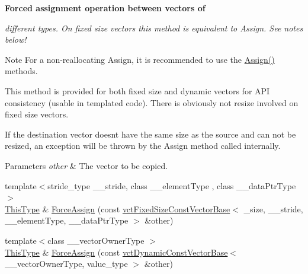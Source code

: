 \begin{Indent}{\bf Forced assignment operation between vectors of}\par
{\em different types. On fixed size vectors this method is equivalent to Assign. See notes below!

\begin{DoxyNote}{Note}
For a non-\/reallocating Assign, it is recommended to use the \hyperlink{classvct_fixed_size_vector_base_a0bfbc67194bcb1aa6b614524df8d1fa1}{Assign()} methods.

This method is provided for both fixed size and dynamic vectors for A\+P\+I consistency (usable in templated code). There is obviously not resize involved on fixed size vectors.

If the destination vector doesn\textquotesingle{}t have the same size as the source and can not be resized, an exception will be thrown by the Assign method called internally.
\end{DoxyNote}

\begin{DoxyParams}{Parameters}
{\em other} & The vector to be copied. \\
\hline
\end{DoxyParams}
}\begin{DoxyCompactItemize}
\item 
{\footnotesize template$<$stride\+\_\+type \+\_\+\+\_\+stride, class \+\_\+\+\_\+element\+Type , class \+\_\+\+\_\+data\+Ptr\+Type $>$ }\\\hyperlink{classvct_fixed_size_const_vector_base_a071063bc4fa43112cc287b2dbef53180}{This\+Type} \& \hyperlink{classvct_fixed_size_vector_base_a27268af4d9808d33446164107bc18d0a}{Force\+Assign} (const \hyperlink{classvct_fixed_size_const_vector_base}{vct\+Fixed\+Size\+Const\+Vector\+Base}$<$ \+\_\+size, \+\_\+\+\_\+stride, \+\_\+\+\_\+element\+Type, \+\_\+\+\_\+data\+Ptr\+Type $>$ \&other)
\item 
{\footnotesize template$<$class \+\_\+\+\_\+vector\+Owner\+Type $>$ }\\\hyperlink{classvct_fixed_size_const_vector_base_a071063bc4fa43112cc287b2dbef53180}{This\+Type} \& \hyperlink{classvct_fixed_size_vector_base_a2d4938c4dfd8f40e12cba75d58fbe816}{Force\+Assign} (const \hyperlink{classvct_dynamic_const_vector_base}{vct\+Dynamic\+Const\+Vector\+Base}$<$ \+\_\+\+\_\+vector\+Owner\+Type, value\+\_\+type $>$ \&other)
\end{DoxyCompactItemize}
\end{Indent}
{\bf }\par
